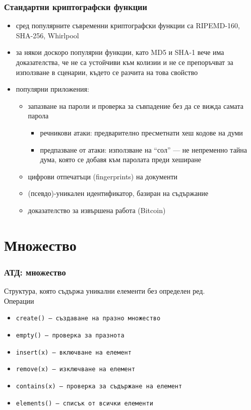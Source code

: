 \documentclass[alsotrans]{beamerswitch}
\begin{document}
\begin{frame}
  \frametitle{Стандартни криптографски функции}
  \begin{itemize}[<+->]
  \item сред популярните съвременни криптографски функции са RIPEMD-160, SHA-256, Whirlpool
  \item за някои доскоро популярни функции, като MD5 и SHA-1 вече има доказателства, че не са устойчиви към колизии и не се препоръчват за използване в сценарии, където се разчита на това свойство
  \item популярни приложения:
    \begin{itemize}
    \item запазване на пароли и проверка за съвпадение без да се вижда самата парола
      \begin{itemize}
      \item речникови атаки: предварително пресметнати хеш кодове на думи
      \item предпазване от атаки: използване на ``сол'' --- не непременно тайна дума, която се добавя към паролата преди хеширане
      \end{itemize}
    \item цифрови отпечатъци (fingerprints) на документи
    \item (псевдо)-уникален идентификатор, базиран на съдържание
    \item доказателство за извършена работа (Bitcoin)
    \end{itemize}
  \end{itemize}
\end{frame}

\section{Множество}

\begin{frame}
  \frametitle{АТД: множество}
  Структура, която съдържа уникални елементи без определен ред.\\
  Операции
  \begin{itemize}
  \item \tt{create()} --- създаване на празно множество
  \item \tt{empty()} --- проверка за празнота
  \item \tt{insert(x)} --- включване на елемент
  \item \tt{remove(x)} --- изключване на елемент
  \item \tt{contains(x)} --- проверка за съдържане на елемент
  \item \tt{elements()} --- списък от всички елементи
  \end{itemize}
\end{frame}
\end{document}
